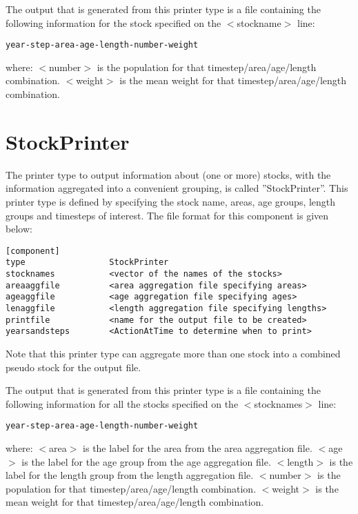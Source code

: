 \documentclass [a4paper, 10pt]{book}
\begin{document}
The output that is generated from this printer type is a file containing the following information for the stock specified on the $<$stockname$>$ line:

\begin{verbatim}
year-step-area-age-length-number-weight
\end{verbatim}

where:\newline
$<$number$>$ is the population for that timestep/area/age/length combination.\newline
$<$weight$>$ is the mean weight for that timestep/area/age/length combination.

\section{StockPrinter}\label{sec:stockprinter}
The printer type to output information about (one or more) stocks, with the information aggregated into a convenient grouping, is called ''StockPrinter''.  This printer type is defined by specifying the stock name, areas, age groups, length groups and timesteps of interest.  The file format for this component is given below:

\begin{verbatim}
[component]
type                 StockPrinter
stocknames           <vector of the names of the stocks>
areaaggfile          <area aggregation file specifying areas>
ageaggfile           <age aggregation file specifying ages>
lenaggfile           <length aggregation file specifying lengths>
printfile            <name for the output file to be created>
yearsandsteps        <ActionAtTime to determine when to print>
\end{verbatim}

Note that this printer type can aggregate more than one stock into a combined pseudo stock for the output file.

\bigskip
The output that is generated from this printer type is a file containing the following information for all the stocks specified on the $<$stocknames$>$ line:

\begin{verbatim}
year-step-area-age-length-number-weight
\end{verbatim}

where:\newline
$<$area$>$ is the label for the area from the area aggregation file.\newline
$<$age$>$ is the label for the age group from the age aggregation file.\newline
$<$length$>$ is the label for the length group from the length aggregation file.\newline
$<$number$>$ is the population for that timestep/area/age/length combination.\newline
$<$weight$>$ is the mean weight for that timestep/area/age/length combination.
\end{document}
